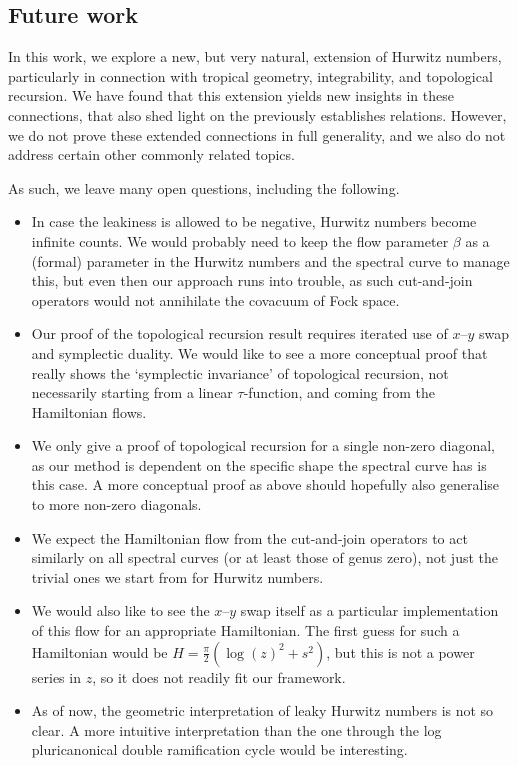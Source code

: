 \documentclass[10pt,a4paper,oneside,no-math,reqno]{amsart}%
\theoremstyle{plain}
\theoremstyle{definition}
\theoremstyle{remark}
\numberwithin{equation}{section}
\newcommand{\1}{\mathds{1}}
\newcommand{\<}{\langle}
\renewcommand{\>}{\rangle}
\begin{document}
\subsection{Future work}

In this work, we explore a new, but very natural, extension of Hurwitz numbers, particularly in connection with tropical geometry, integrability, and topological recursion. We have found that this extension yields new insights in these connections, that also shed light on the previously establishes relations. However, we do not prove these extended connections in full generality, and we also do not address certain other commonly related topics.

As such, we leave many open questions, including the following.

\begin{itemize}
    \item In case the leakiness is allowed to be negative, Hurwitz numbers become infinite counts. We would probably need to keep the flow parameter $ \beta$ as a (formal) parameter in the Hurwitz numbers and the spectral curve to manage this, but even then our approach runs into trouble, as such cut-and-join operators would not annihilate the covacuum of Fock space.
    \item Our proof of the topological recursion result requires iterated use of $ x$--$y$ swap and symplectic duality. We would like to see a more conceptual proof that really shows the `symplectic invariance' of topological recursion, not necessarily starting from a linear $ \tau$-function, and coming from the Hamiltonian flows.
    \item We only give a proof of topological recursion for a single non-zero diagonal, as our method is dependent on the specific shape the spectral curve has is this case. A more conceptual proof as above should hopefully also generalise to more non-zero diagonals.
    \item We expect the Hamiltonian flow from the cut-and-join operators to act similarly on all spectral curves (or at least those of genus zero), not just the trivial ones we start from for Hurwitz numbers.
    \item We would also like to see the $x$--$y$ swap itself as a particular implementation of this flow for an appropriate Hamiltonian. The first guess for such a Hamiltonian would be $ H = \frac{\pi}{2} ( \log(z)^2 + s^2 )$, but this is not a power series in $z$, so it does not readily fit our framework.
    \item As of now, the geometric interpretation of leaky Hurwitz numbers is not so clear. A more intuitive interpretation than the one through the log pluricanonical double ramification cycle would be interesting.

\end{itemize}
\end{document}
